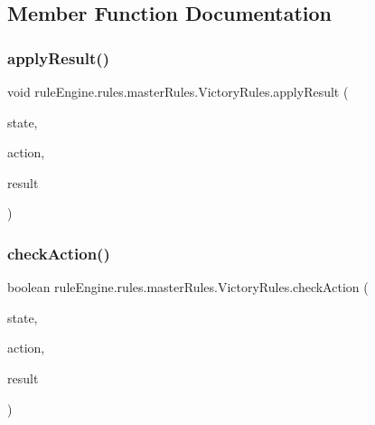 \subsection{Member Function Documentation}
\mbox{\label{classrule_engine_1_1rules_1_1master_rules_1_1_victory_rules_a93ffec6d57021369a8f6ab2f493d97d2}} 
\subsubsection{\texorpdfstring{apply\+Result()}{applyResult()}}
{\footnotesize\ttfamily void rule\+Engine.\+rules.\+master\+Rules.\+Victory\+Rules.\+apply\+Result (\begin{DoxyParamCaption}\item[{\mbox{\hyperlink{classgame_1_1game_state_1_1_game_state}{Game\+State}}}]{state,  }\item[{\mbox{\hyperlink{classrule_engine_1_1_game_action}{Game\+Action}}}]{action,  }\item[{\mbox{\hyperlink{classrule_engine_1_1_rule_result}{Rule\+Result}}}]{result }\end{DoxyParamCaption})\hspace{0.3cm}{\ttfamily [inline]}}

\mbox{\label{classrule_engine_1_1rules_1_1master_rules_1_1_victory_rules_a9f52825deabf9b02fe2b879be5064ae7}} 
\subsubsection{\texorpdfstring{check\+Action()}{checkAction()}}
{\footnotesize\ttfamily boolean rule\+Engine.\+rules.\+master\+Rules.\+Victory\+Rules.\+check\+Action (\begin{DoxyParamCaption}\item[{\mbox{\hyperlink{classgame_1_1game_state_1_1_game_state}{Game\+State}}}]{state,  }\item[{\mbox{\hyperlink{classrule_engine_1_1_game_action}{Game\+Action}}}]{action,  }\item[{\mbox{\hyperlink{classrule_engine_1_1_rule_result}{Rule\+Result}}}]{result }\end{DoxyParamCaption})\hspace{0.3cm}{\ttfamily [inline]}}



